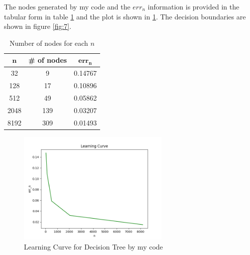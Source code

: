 \documentclass[a4paper]{article}
\theoremstyle{definition}
\newenvironment{soln}{
    \leavevmode\color{blue}\ignorespaces
}{}
\begin{document}
\begin{enumerate}
  \begin{soln}
      The nodes generated by my code and the $err_n$ information is provided in the tabular form in table \ref{tab:2} and the plot is shown in \ref{fig:6}.
      The decision boundaries are shown in figure \ref{fig:7}.

      \begin{table}[h]
          \centering
          \begin{tabular}{|c|c|c|}
              \hline
              $\mathbf{n}$ & \textbf{\# of nodes} & $\mathbf{err_n}$ \\
              \hline
              32 & 9 & 0.14767 \\
              \hline
              128 & 17 & 0.10896 \\
              \hline
              512 & 49 & 0.05862 \\
              \hline
              2048 & 139 & 0.03207 \\
              \hline
              8192 & 309 & 0.01493 \\
              \hline
          \end{tabular}
          \caption{Number of nodes for each $n$}
          \label{tab:2}
      \end{table}

    \begin{figure}[h]
        \centering
        \includegraphics[width=0.65\textwidth]{err_n.png}
        \caption{Learning Curve for Decision Tree by my code}
        \label{fig:6}
    \end{figure}


\end{soln}
\end{enumerate}
\end{document}
